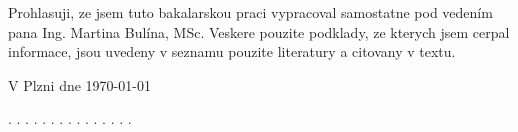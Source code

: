 
\begin{declaration}


\vspace*{0.2\textheight}
Prohlasuji, ze jsem tuto bakalarskou praci vypracoval samostatne pod vedením pana Ing. Martina Bulína, MSc. Veskere pouzite podklady, ze kterych jsem cerpal informace, jsou uvedeny v seznamu pouzite literatury a citovany v textu.\bigbreak

\vfill
\begin{minipage}[t]{0.45\textwidth}
\begin{flushleft} 
V Plzni dne {\today}
\end{flushleft}
\end{minipage}
\begin{minipage}[t]{0.45\textwidth}
\begin{flushright}
. . . . . . . . . . . . . . . \\ 
\vspace{3mm}
{\authorname}
\end{flushright}
\end{minipage}\\[2.5cm]

\end{declaration}
\cleardoublepage

